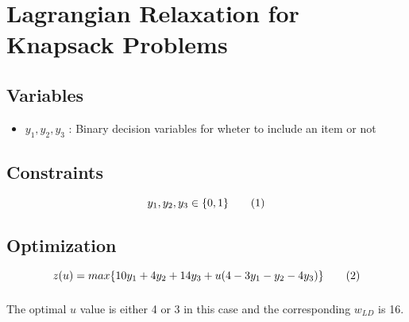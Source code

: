 \section{Lagrangian Relaxation for Knapsack Problems}

\subsection{Variables}
\begin{itemize}
	\item $y_1, y_2, y_3$ : Binary decision variables for wheter to include an item or not
\end{itemize}

\subsection{Constraints}

\[ y_1,y_2,y_3 \in \{0,1\} \addtag \]

\subsection{Optimization}
\[ z(u) = max\{10y_1 + 4y_2 + 14y_3 + u(4 - 3y_1 - y_2 - 4y_3)\} \addtag \]

\subsubsection{ }  

The optimal $u$ value is either 4 or 3 in this case and the corresponding $w_{LD}$ is 16.

\subsubsection{ } 
